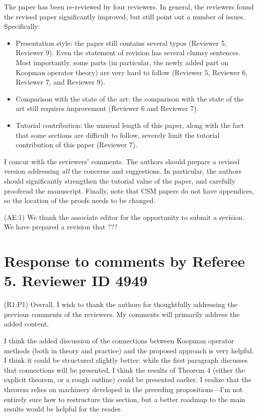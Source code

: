 \documentclass{letter}
\begin{document}
The paper has been re-reviewed by four reviewers. In general, the reviewers found the revised paper significantly improved, but still
point out a number of issues. Specifically:
\begin{itemize}
	\item Presentation style: the paper still contains several typos (Reviewer 5, Reviewer 9). Even the statement of revision has several clumsy sentences. Most importantly, some parts (in particular, the newly added	part on Koopman operator theory) are very hard to follow (Reviewer 5, Reviewer 6, Reviewer 7, and Reviewer 9).
	\item Comparison with the state of the art: the comparison with the state of the art still requires improvement (Reviewer 6 and Reviewer 7).
	\item Tutorial contribution: the unusual length of this paper, along with the fact that some sections are difficult to follow, severely limit the tutorial contribution of this paper (Reviewer 7).
\end{itemize}

I concur with the reviewers' comments. The authors should prepare a revised version addressing \emph{all} the concerns and suggestions. In
particular, the authors should significantly strengthen the tutorial value of the paper, and carefully proofread the manuscript. Finally,
note that CSM papers do not have appendices, so the location of the proofs needs to be changed.

{\color{red}(AE:1)} We thank the associate editor for the opportunity to submit a revision.  We have prepared a revision that ???


\section{Response to comments by Referee 5. Reviewer ID 4949}

{\color{red}(R1:P1)} Overall, I wish to thank the authors for thoughtfully addressing the previous comments of the reviewers. My comments will primarily address the added content. 

I think the added discussion of the connections between Koopman operator methods (both in theory and practice) and the proposed
approach is very helpful. I think it could be structured slightly better: while the first paragraph discusses that connections will be
presented, I think the results of Theorem 4 (either the explicit theorem, or a rough outline) could be presented earlier. I realize that
the theorem relies on machinery developed in the preceding propositions---I'm not entirely sure how to restructure this section,
but a better roadmap to the main results would be helpful for the reader. 
\end{document}
